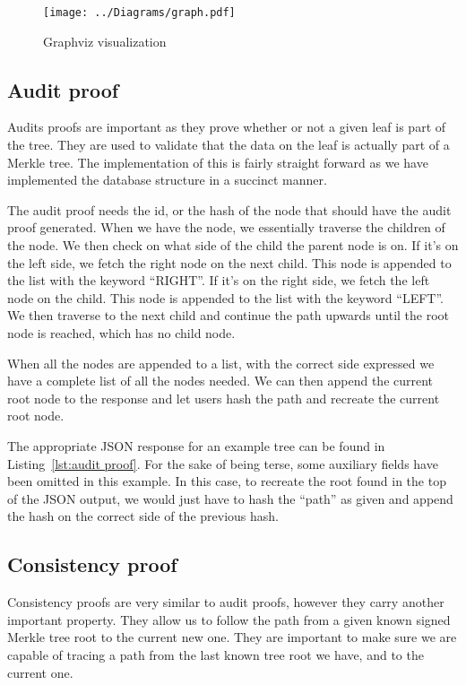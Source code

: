 \documentclass[../Main/thesis.tex]{subfiles}
\begin{document}
\begin{figure}[H]
\centering
\texttt{[image: ../Diagrams/graph.pdf]}
\caption{Graphviz visualization}
\label{fig:graphviz_pdf}
\end{figure}


\subsection*{Audit proof}%
\label{sub:audit_proof_implementation}
Audits proofs are important as they prove whether or not a given leaf is part of
the tree. They are used to validate that the data on the leaf is actually part
of a Merkle tree. The implementation of this is fairly straight forward as we
have implemented the database structure in a succinct manner.

The audit proof needs the id, or the hash of the node that should have the audit
proof generated. When we have the node, we essentially traverse the children of
the node. We then check on what side of the child the parent node is on. If it's
on the left side, we fetch the right node on the next child. This node is
appended to the list with the keyword ``RIGHT''. If it's on the right side, we
fetch the left node on the child. This node is appended to the list with the
keyword ``LEFT''. We then traverse to the next child and continue the path
upwards until the root node is reached, which has no child node.

When all the nodes are appended to a list, with the correct side expressed we
have a complete list of all the nodes needed. We can then append the current
root node to the response and let users hash the path and recreate the current
root node.

The appropriate JSON response for an example tree can be found in
Listing~\ref{lst:audit proof}. For the sake of being terse, some auxiliary
fields have been omitted in this example. In this case, to recreate the root
found in the top of the JSON output, we would just have to hash the ``path'' as
given and append the hash on the correct side of the previous hash.

\subsection*{Consistency proof}%
\label{sub:consistency_proof_implementation}
Consistency proofs are very similar to audit proofs, however they carry another
important property. They allow us to follow the path from a given known signed
Merkle tree root to the current new one. They are important to make sure we are
capable of tracing a path from the last known tree root we have, and to the
current one. 
\end{document}
